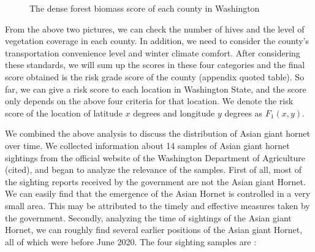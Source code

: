 \documentclass{mcmthesis}
\numberwithin{figure}{section}
\numberwithin{table}{section}
\begin{document}
\begin{figure}[H]
  \caption{The dense forest biomass score of each county in Washington}\label{1_2}
\end{figure}

From the above two pictures, we can check the number of hives and the level of vegetation coverage in each county. In addition, we need to consider the county’s transportation convenience level and winter climate comfort. After considering these standards, we will sum up the scores in these four categories and the final score obtained is the risk grade score of the county (appendix quoted table). So far, we can give a risk score to each location in Washington State, and the score only depends on the above four criteria for that location. We denote the risk score of the location of latitude $x$ degrees and longitude $y$ degrees as $F_1(x,y)$.

We combined the above analysis to discuss the distribution of Asian giant hornet over time. We collected information about 14 samples of Asian giant hornet sightings from the official website of the Washington Department of Agriculture (cited), and began to analyze the relevance of the samples. First of all, most of the sighting reports received by the government are not the Asian giant Hornet. We can easily find that the emergence of the Asian Hornet is controlled in a very small area. This may be attributed to the timely and effective measures taken by the government. Secondly, analyzing the time of sightings of the Asian giant Hornet, we can roughly find several earlier positions of the Asian giant Hornet, all of which were before June 2020. The four sighting samples are :
\end{document}

